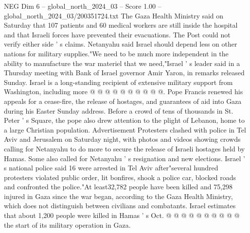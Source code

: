 \begin{textsample}{NEG Dim 6 – global\_north\_2024\_03 – Score 1.00 – global\_north\_2024\_03/200351724.txt}
The Gaza Health Ministry said on Saturday that 107 patients and 60 medical workers are still inside the hospital and that Israeli forces have prevented their evacuations.
The Post could not verify either side ' s claims.
Netanyahu said Israel should depend less on other nations for military supplies."We need to be much more independent in the ability to manufacture the war materiel that we need,"Israel ' s leader said in a Thursday meeting with Bank of Israel governor Amir Yaron, in remarks released Sunday.
Israel is a long-standing recipient of extensive military support from Washington, including more @ @ @ @ @ @ @ @ @ @.
Pope Francis renewed his appeals for a cease-fire, the release of hostages, and guarantees of aid into Gaza during his Easter Sunday address.
Before a crowd of tens of thousands in St.
Peter ' s Square, the pope also drew attention to the plight of Lebanon, home to a large Christian population.
Advertisement Protesters clashed with police in Tel Aviv and Jerusalem on Saturday night, with photos and videos showing crowds calling for Netanyahu to do more to secure the release of Israeli hostages held by Hamas.
Some also called for Netanyahu ' s resignation and new elections.
Israel ' s national police said 16 were arrested in Tel Aviv after"several hundred protesters violated public order, lit bonfires, shook a police car, blocked roads and confronted the police."At least32,782 people have been killed and 75,298 injured in Gaza since the war began, according to the Gaza Health Ministry, which does not distinguish between civilians and combatants.
Israel estimates that about 1,200 people were killed in Hamas ' s Oct. @ @ @ @ @ @ @ @ @ @ the start of its military operation in Gaza.

\end{textsample}
